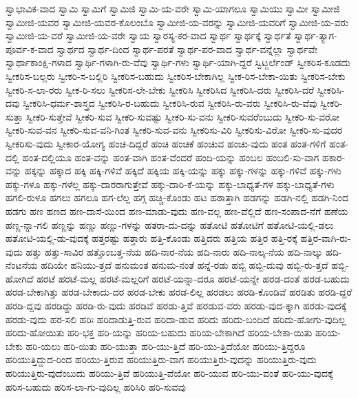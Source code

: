 {ಸ್ವಾಭಾವಿಕ-ವಾದ
ಸ್ವಾಮಿ
ಸ್ವಾಮಿಗೆ
ಸ್ವಾಮಿಜಿ
ಸ್ವಾಮಿ-ಯ-ವರೇ
ಸ್ವಾಮಿ-ಯಾಗಲೂ
ಸ್ವಾಮಿಯು
ಸ್ವಾಮೀ
ಸ್ವಾಮೀಜಿ
ಸ್ವಾಮೀಜಿ-ಯವರ
ಸ್ವಾಮೀಜಿ-ಯವರ-ಕೊಲಂಬೊ
ಸ್ವಾಮೀಜಿ-ಯ-ವರನ್ನು
ಸ್ವಾಮೀಜಿ-ಯವರಿಗೆ
ಸ್ವಾಮೀಜಿ-ಯ-ವರು
ಸ್ವಾಮೀಜಿ-ಯ-ವರೆ
ಸ್ವಾಮೀಜಿ-ಯ-ವರೇ
ಸ್ವಾಯ
ಸ್ವಾರಸ್ಯ-ಕರ-ವಾದ
ಸ್ವಾರ್ಥ
ಸ್ವಾರ್ಥಕ್ಕೆ
ಸ್ವಾರ್ಥತೆ
ಸ್ವಾರ್ಥ-ತ್ಯಾಗ-ಪೂರ್ವ-ಕ-ವಾದ
ಸ್ವಾರ್ಥದ
ಸ್ವಾರ್ಥ-ದಿಂದ
ಸ್ವಾರ್ಥ-ಪರತೆ
ಸ್ವಾರ್ಥ-ಪರ-ವಾದ
ಸ್ವಾರ್ಥ-ವನ್ನೆಲ್ಲಾ
ಸ್ವಾರ್ಥವೇ
ಸ್ವಾರ್ಥಾಕಾಂಕ್ಷಿ-ಗಳಾದ
ಸ್ವಾರ್ಥಿ-ಗಳಾಗಿ-ರು-ವೆವು
ಸ್ವಾರ್ಥಿ-ಗಳು
ಸ್ವಾರ್ಥಿ-ಯಾಗಿ-ದ್ದರೆ
ಸ್ವಿಟ್ಜರ್ಲೆಂಡ್
ಸ್ವೀಕರಿಸ-ಕೂಡದು
ಸ್ವೀಕರಿಸ-ಬಲ್ಲರು
ಸ್ವೀಕರಿ-ಸ-ಬಲ್ಲಿರಿ
ಸ್ವೀಕರಿಸ-ಬಹುದು
ಸ್ವೀಕರಿಸ-ಬೇಕಾಗಿಲ್ಲ
ಸ್ವೀಕ-ರಿಸ-ಬೇಕಾ-ಯಿತು
ಸ್ವೀಕರಿಸ-ಬೇಕು
ಸ್ವೀಕರಿ-ಸ-ಲಾ-ರರು
ಸ್ವೀಕ-ರಿ-ಸಲು
ಸ್ವೀಕರಿಸ-ಲೇ-ಬೇಕು
ಸ್ವೀಕರಿಸಿ
ಸ್ವೀಕರಿಸಿದ
ಸ್ವೀಕರಿಸಿ-ದರು
ಸ್ವೀಕರಿಸಿ-ದರೆ
ಸ್ವೀಕರಿಸಿ-ದವು
ಸ್ವೀಕರಿಸಿ-ಧರ್ಮ-ಶಾಸ್ತ್ರದ
ಸ್ವೀಕರಿಸಿ-ರ-ಬಹುದು
ಸ್ವೀಕರಿಸಿ-ರುವ
ಸ್ವೀಕರಿಸಿ-ರು-ವರು
ಸ್ವೀಕರಿಸಿ-ರು-ವೆವು
ಸ್ವೀಕರಿ-ಸುತ್ತಾ
ಸ್ವೀಕರಿ-ಸುತ್ತೇವೆ
ಸ್ವೀಕರಿ-ಸುವ
ಸ್ವೀಕರಿ-ಸುವಷ್ಟು
ಸ್ವೀಕರಿ-ಸು-ವನು
ಸ್ವೀಕರಿ-ಸುವರೆಂಬುದು
ಸ್ವೀಕರಿ-ಸು-ವರೋ
ಸ್ವೀಕರಿ-ಸುವ-ವನ
ಸ್ವೀಕರಿ-ಸುವ-ವನಿ-ಗಿಂತ
ಸ್ವೀಕರಿ-ಸುವ-ವನು
ಸ್ವೀಕರಿಸು-ವಿರಿ
ಸ್ವೀಕರಿಸು-ವಿರೋ
ಸ್ವೀಕರಿ-ಸು-ವುದರ
ಸ್ವೀಕರಿಸು-ವುದು
ಸ್ವೀಕಾರ-ಯೋಗ್ಯ
ಹಂಚ-ದಿದ್ದರೆ
ಹಂಚಿ
ಹಂಚಿಕೆ
ಹಂಚುವ
ಹಂಚು-ವುದು
ಹಂತ
ಹಂತ-ಗಳಿಗೆ
ಹಂತ-ದಲ್ಲಿ
ಹಂತ-ದಲ್ಲಿಯೂ
ಹಂತ-ವನ್ನು
ಹಂತ-ವಾಗಿ
ಹಂತ-ವೆಂದರೆ
ಹಂದಿ-ಯನ್ನು
ಹಂಬಲ
ಹಂಬಲಿ-ಸು-ವಾಗ
ಹಕಾರ-ವನ್ನು
ಹಕ್ಕನ್ನು
ಹಕ್ಕಾದ
ಹಕ್ಕಿ
ಹಕ್ಕಿ-ಗಳಿವೆ
ಹಕ್ಕಿದೆ
ಹಕ್ಕಿಯ
ಹಕ್ಕಿ-ಯನ್ನು
ಹಕ್ಕು
ಹಕ್ಕು-ಗಳನ್ನು
ಹಕ್ಕು-ಗಳಿವೆ
ಹಕ್ಕು-ಗಳು
ಹಕ್ಕು-ಗಳೂ
ಹಕ್ಕು-ಗಳೆಲ್ಲ
ಹಕ್ಕು-ದಾರರಾಗುತ್ತೇವೆ
ಹಕ್ಕು-ದಾರಿ-ಕೆ-ಯನ್ನು
ಹಕ್ಕು-ಬಾಧ್ಯತೆ-ಗಳ
ಹಕ್ಕು-ಬಾಧ್ಯತೆ-ಗಳು
ಹಗಲಿ-ರುಳೂ
ಹಗಲು
ಹಗಲೂ
ಹಗ-ಲೆಲ್ಲ
ಹಗ್ಗ
ಹಚ್ಚಿ-ಕೊಂಡು
ಹಟ
ಹಠಾತ್ತಾಗಿ
ಹಡಗನ್ನು
ಹಡಗಿ-ನಲ್ಲಿ
ಹಡಗಿ-ನಿಂದ
ಹಡಗು
ಹಣ
ಹಣದ
ಹಣ-ದಾಸೆ-ಯಿಂದ
ಹಣ-ಮಾಡು-ವುದು
ಹಣ-ವಲ್ಲ
ಹಣ-ವೆಲ್ಲಿದೆ
ಹಣ-ಸಂಪಾದ-ನೆಗೆ
ಹಣೆಯ
ಹಣ್ಣ-ನ್ನಾ-ಗಲಿ
ಹಣ್ಣನ್ನು
ಹಣ್ಣು
ಹಣ್ಣು-ಗಳನ್ನು
ಹತರಾ-ದು-ದನ್ನು
ಹತೋಟಿ
ಹತೋಟಿಗೆ
ಹತೋಟಿ-ಯಲ್ಲಿ-ಡಲು
ಹತೋಟಿ-ಯಲ್ಲಿ-ಡು-ವುದಕ್ಕೆ
ಹತ್ತರಷ್ಟು
ಹತ್ತಾರು
ಹತ್ತಿ-ಕೊಂಡು
ಹತ್ತಿದರು
ಹತ್ತಿಯ
ಹತ್ತಿರ
ಹತ್ತಿ-ರಕ್ಕೆ
ಹತ್ತಿರ-ವಾಗಿ-ರು-ವುದು
ಹತ್ತು
ಹತ್ತು-ಸಾವಿರ
ಹತ್ತೊಂಬತ್ತ-ನೆಯ
ಹದಿ-ನಾರ-ನೆಯ
ಹದಿ-ನಾರು
ಹದಿ-ನಾಲ್ಕ-ನೆಯ
ಹದಿ-ನಾಲ್ಕು
ಹದಿ-ನೆಂಟನೆಯ
ಹದಿಯೇ
ಹನಿಯು-ತ್ತದೆ
ಹನುಮಂತ
ಹನುಮ-ನಂತೆ
ಹನ್ನೆ-ರಡು
ಹಬ್ಬಿ
ಹಬ್ಬಿ-ದುವು
ಹಬ್ಬಿ-ರು-ತ್ತದೆ
ಹಬ್ಬಿ-ಹೋಗಿದೆ
ಹರಟೆ
ಹರಟೆ-ಮಲ್ಲ
ಹರಟೆ-ಮಲ್ಲರಿಗೆ
ಹರಟೆ-ಯನ್ನಾ-ದರೂ
ಹರಟೆ-ಯನ್ನೇ
ಹರಡ-ದಂತೆ
ಹರಡ-ಬಹುದು
ಹರಡ-ಬೇಕಾಗಿತ್ತು
ಹರಡ-ಬೇಕಾದು-ದರ
ಹರಡ-ಬೇಕು
ಹರಡ-ಲಿಲ್ಲ
ಹರಡಲು
ಹರಡಿ-ಕೊಂಡಿವೆ
ಹರಡಿತು
ಹರಡಿ-ದ್ದರೆ
ಹರಡಿ-ದ್ದವು
ಹರಡಿದ್ದು
ಹರಡಿ-ರು-ವುದು
ಹರಡಿವೆ
ಹರಡು-ತ್ತಿವೆ
ಹರಡುವ-ವರು
ಹರಡು-ವುದ-ಕ್ಕಾಗಿ
ಹರಡು-ವುದಕ್ಕೆ
ಹರಡು-ವುದು
ಹರ-ಸಲಿ
ಹರಿಃ
ಹರಿದಾಡುತ್ತಿ-ರುವ
ಹರಿದಾ-ಡುವ
ಹರಿದು
ಹರಿದು-ಬಂದಿದೆ
ಹರಿದು-ಹೋಗು-ವುದಿಲ್ಲ
ಹರಿದು-ಹೋಯಿತು
ಹರಿ-ಭಕ್ತ
ಹರಿ-ಯನ್ನು
ಹರಿಯ-ಬಹುದು
ಹರಿಯ-ಬೇಕಾಗಿದೆ
ಹರಿಯ-ಬೇಕಾ-ಯಿತು
ಹರಿಯ-ಬೇಕು
ಹರಿ-ಯಲು
ಹರಿ-ಯಿತು
ಹರಿ-ಯುತ್ತಾ
ಹರಿ-ಯು-ತ್ತಿದೆ
ಹರಿ-ಯು-ತ್ತಿದೆಯೋ
ಹರಿಯು-ತ್ತಿದ್ದರೂ
ಹರಿಯುತ್ತಿದ್ದುದ-ರಿಂದ
ಹರಿಯು-ತ್ತಿರುವ
ಹರಿಯುತ್ತಿರು-ವಾಗ
ಹರಿಯುತ್ತಿರು-ವುದನ್ನು
ಹರಿಯುತ್ತಿರು-ವುದು
ಹರಿಯುತ್ತಿರು-ವುದೆಂಬುದು
ಹರಿಯು-ತ್ತಿವೆ
ಹರಿಯುತ್ತಿ-ವೆಯೋ
ಹರಿ-ಯುವ
ಹರಿ-ಯು-ವಂತೆ
ಹರಿ-ಯು-ವುದಕ್ಕೆ
ಹರಿಸ-ಬಹುದು
ಹರಿಸ-ಲಾ-ಗು-ವುದಿಲ್ಲ
ಹರಿಸಿರಿ
ಹರಿ-ಸುವವು
}
